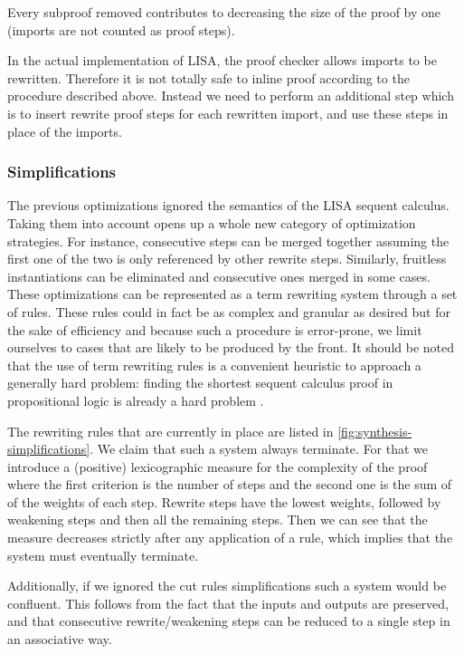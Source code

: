 Every subproof removed contributes to decreasing the size of the proof by one (imports are not counted as proof steps).

In the actual implementation of LISA, the proof checker allows imports to be rewritten. Therefore it is not totally safe to inline proof according to the procedure described above. Instead we need to perform an additional step which is to insert rewrite proof steps for each rewritten import, and use these steps in place of the imports.

\subsubsection{Simplifications}

The previous optimizations ignored the semantics of the LISA sequent calculus. Taking them into account opens up a whole new category of optimization strategies.
For instance, consecutive  steps can be merged together assuming the first one of the two is only referenced by other rewrite steps. Similarly, fruitless instantiations can be eliminated and consecutive ones merged in some cases. These optimizations can be represented as a term rewriting system through a set of rules. These rules could in fact be as complex and granular as desired but for the sake of efficiency and because such a procedure is error-prone, we limit ourselves to cases that are likely to be produced by the front. It should be noted that the use of term rewriting rules is a convenient heuristic to approach a generally hard problem: finding the shortest sequent calculus proof in propositional logic is already a hard problem \cite{Krajicek1994}.

The rewriting rules that are currently in place are listed in \autoref{fig:synthesis-simplifications}. We claim that such a system always terminate. For that we introduce a (positive) lexicographic measure for the complexity of the proof where the first criterion is the number of steps and the second one is the sum of of the weights of each step. Rewrite steps have the lowest weights, followed by weakening steps and then all the remaining steps. Then we can see that the measure decreases strictly after any application of a rule, which implies that the system must eventually terminate.

Additionally, if we ignored the cut rules simplifications such a system would be confluent. This follows from the fact that the inputs and outputs are preserved, and that consecutive rewrite/weakening steps can be reduced to a single step in an associative way.

